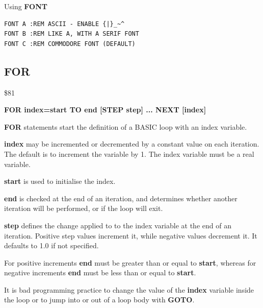 \begin{description}[leftmargin=2cm,style=nextline]
\item [Examples:] Using {\bf FONT}
\begin{tcolorbox}[colback=black,coltext=white]
\begin{verbatim}
FONT A :REM ASCII - ENABLE {|}_~^
FONT B :REM LIKE A, WITH A SERIF FONT
FONT C :REM COMMODORE FONT (DEFAULT)
\end{verbatim}
\end{tcolorbox}
\end{description}


\newpage
\subsection{FOR}
\begin{description}[leftmargin=2cm,style=nextline]
\item [Token:] \$81
\item [Format:] {\bf FOR index=start TO end [STEP step] ... NEXT [index]}
\item [Usage:] {\bf FOR} statements start the definition
               of a BASIC loop with an index variable.

               {\bf index} may be incremented or decremented
               by a constant value on each iteration. The default
               is to increment the variable by 1.
               The index variable must be a real variable.

               {\bf start} is used to initialise the index.

               {\bf end} is checked at the end of an iteration,
               and determines whether another iteration will be performed,
               or if the loop will exit.

               {\bf step} defines the change applied to
               to the index variable at the end of an iteration.
               Positive step values increment it, while negative values
               decrement it. It defaults to 1.0 if not specified.

\item [Remarks:] For positive increments {\bf end} must be greater than
               or equal to {\bf start}, whereas for negative increments
               {\bf end} must be less than or equal to {\bf start}.

               It is bad programming practice to change the value
               of the {\bf index} variable inside the loop or to
               jump into or out of a loop body with {\bf GOTO}.


\end{description}
